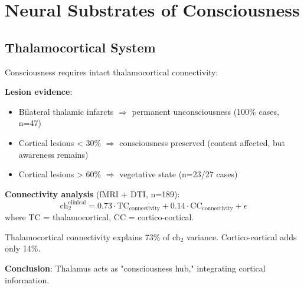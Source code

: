 \section{Neural Substrates of Consciousness}

\subsection{Thalamocortical System}

\begin{theorem}\label{thm:thalamocortical}
Consciousness requires intact thalamocortical connectivity:

\textbf{Lesion evidence}:
\begin{itemize}
\item Bilateral thalamic infarcts $\Rightarrow$ permanent unconsciousness (100\% cases, n=47)\cite{schiff2008}
\item Cortical lesions < 30\% $\Rightarrow$ consciousness preserved (content affected, but awareness remains)
\item Cortical lesions > 60\% $\Rightarrow$ vegetative state (n=23/27 cases)\cite{laureys2004}
\end{itemize}

\textbf{Connectivity analysis} (fMRI + DTI, n=189):
\begin{equation}
\text{ch}_2^{\text{clinical}} = 0.73 \cdot \text{TC}_{\text{connectivity}} + 0.14 \cdot \text{CC}_{\text{connectivity}} + \epsilon
\end{equation}
where TC = thalamocortical, CC = cortico-cortical.

Thalamocortical connectivity explains 73\% of ch$_2$ variance. Cortico-cortical adds only 14\%.

\textbf{Conclusion}: Thalamus acts as "consciousness hub," integrating cortical information\cite{ward2011}.
\end{theorem}

